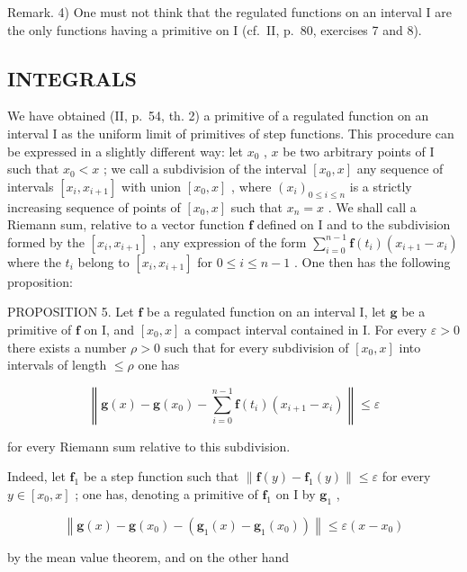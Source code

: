 Remark. 4) One must not think that the regulated functions on an interval I are the only functions having a primitive on I (cf.~II, p.~80, exercises 7 and 8).

\subsection{INTEGRALS}

We have obtained (II, p.~54, th. 2) a primitive of a regulated function on an interval I as the uniform limit of primitives of step functions. This procedure can be expressed in a slightly different way: let \(x_0\) , \(x\) be two arbitrary points of I such that \(x_0 < x\) ; we call a subdivision of the interval \([x_0, x]\) any sequence of intervals \([x_i, x_{i+1}]\) with union \([x_0, x]\) , where \((x_i)_{0 \leqslant i \leqslant n}\) is a strictly increasing sequence of points of \([x_0, x]\) such that \(x_n = x\) . We shall call a Riemann sum, relative to a vector function \(\mathbf{f}\) defined on I and to the subdivision formed by the \([x_i, x_{i+1}]\) , any expression of the form \(\sum_{i=0}^{n-1} \mathbf{f}(t_i)(x_{i+1} - x_i)\) where the \(t_i\) belong to \([x_i, x_{i+1}]\) for \(0 \leqslant i \leqslant n-1\) . One then has the following proposition:

PROPOSITION 5. Let \(\mathbf{f}\) be a regulated function on an interval I, let \(\mathbf{g}\) be a primitive of \(\mathbf{f}\) on I, and \([x_0, x]\) a compact interval contained in I. For every \(\varepsilon > 0\) there exists a number \(\rho > 0\) such that for every subdivision of \([x_0, x]\) into intervals of length \(\leqslant \rho\) one has

\[
\left\| \mathbf {g} (x) - \mathbf {g} (x _ {0}) - \sum_ {i = 0} ^ {n - 1} \mathbf {f} (t _ {i}) (x _ {i + 1} - x _ {i}) \right\| \leqslant \varepsilon\tag{1}
\]

for every Riemann sum relative to this subdivision.

Indeed, let \(\mathbf{f}_1\) be a step function such that \(\| \mathbf{f}(y) - \mathbf{f}_1(y)\| \leqslant \varepsilon\) for every \(y\in [x_0,x]\) ; one has, denoting a primitive of \(\mathbf{f}_1\) on I by \(\mathbf{g}_1\) ,

\[
\left\| \mathbf {g} (x) - \mathbf {g} \left(x _ {0}\right) - \left(\mathbf {g} _ {1} (x) - \mathbf {g} _ {1} \left(x _ {0}\right)\right) \right\| \leqslant \varepsilon \left(x - x _ {0}\right)
\]

by the mean value theorem, and on the other hand

